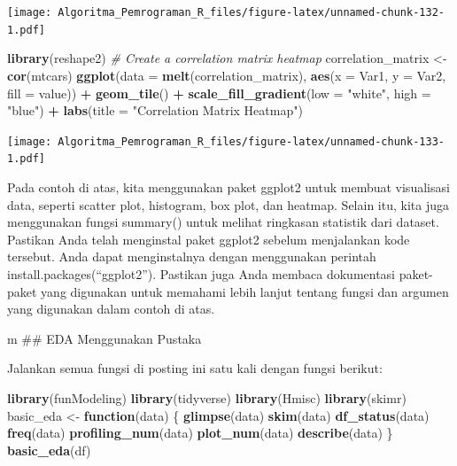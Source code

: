\documentclass[
]{book}
\newenvironment{Shaded}{\begin{snugshade}}{\end{snugshade}}
\newcommand{\AttributeTok}[1]{\textcolor[rgb]{0.13,0.29,0.53}{#1}}
\newcommand{\CommentTok}[1]{\textcolor[rgb]{0.56,0.35,0.01}{\textit{#1}}}
\newcommand{\ControlFlowTok}[1]{\textcolor[rgb]{0.13,0.29,0.53}{\textbf{#1}}}
\newcommand{\FunctionTok}[1]{\textcolor[rgb]{0.13,0.29,0.53}{\textbf{#1}}}
\newcommand{\NormalTok}[1]{#1}
\newcommand{\OtherTok}[1]{\textcolor[rgb]{0.56,0.35,0.01}{#1}}
\newcommand{\SpecialCharTok}[1]{\textcolor[rgb]{0.81,0.36,0.00}{\textbf{#1}}}
\newcommand{\StringTok}[1]{\textcolor[rgb]{0.31,0.60,0.02}{#1}}
\begin{document}
\texttt{[image: Algoritma\_Pemrograman\_R\_files/figure-latex/unnamed-chunk-132-1.pdf]}

\begin{Shaded}
\begin{Highlighting}[]
\FunctionTok{library}\NormalTok{(reshape2)}
\CommentTok{\# Create a correlation matrix heatmap}
\NormalTok{correlation\_matrix }\OtherTok{\textless{}{-}} \FunctionTok{cor}\NormalTok{(mtcars)}
\FunctionTok{ggplot}\NormalTok{(}\AttributeTok{data =} \FunctionTok{melt}\NormalTok{(correlation\_matrix), }\FunctionTok{aes}\NormalTok{(}\AttributeTok{x =}\NormalTok{ Var1, }\AttributeTok{y =}\NormalTok{ Var2, }\AttributeTok{fill =}\NormalTok{ value)) }\SpecialCharTok{+}
  \FunctionTok{geom\_tile}\NormalTok{() }\SpecialCharTok{+}
  \FunctionTok{scale\_fill\_gradient}\NormalTok{(}\AttributeTok{low =} \StringTok{"white"}\NormalTok{, }\AttributeTok{high =} \StringTok{"blue"}\NormalTok{) }\SpecialCharTok{+}
  \FunctionTok{labs}\NormalTok{(}\AttributeTok{title =} \StringTok{"Correlation Matrix Heatmap"}\NormalTok{)}
\end{Highlighting}
\end{Shaded}

\texttt{[image: Algoritma\_Pemrograman\_R\_files/figure-latex/unnamed-chunk-133-1.pdf]}

Pada contoh di atas, kita menggunakan paket ggplot2 untuk membuat visualisasi data, seperti scatter plot, histogram, box plot, dan heatmap. Selain itu, kita juga menggunakan fungsi summary() untuk melihat ringkasan statistik dari dataset. Pastikan Anda telah menginstal paket ggplot2 sebelum menjalankan kode tersebut. Anda dapat menginstalnya dengan menggunakan perintah install.packages(``ggplot2''). Pastikan juga Anda membaca dokumentasi paket-paket yang digunakan untuk memahami lebih lanjut tentang fungsi dan argumen yang digunakan dalam contoh di atas.

m
\#\# EDA Menggunakan Pustaka

Jalankan semua fungsi di posting ini satu kali dengan fungsi berikut:

\begin{Shaded}
\begin{Highlighting}[]
\FunctionTok{library}\NormalTok{(funModeling) }
\FunctionTok{library}\NormalTok{(tidyverse) }
\FunctionTok{library}\NormalTok{(Hmisc)}
\FunctionTok{library}\NormalTok{(skimr)}
\NormalTok{basic\_eda }\OtherTok{\textless{}{-}} \ControlFlowTok{function}\NormalTok{(data)}
\NormalTok{\{}
  \FunctionTok{glimpse}\NormalTok{(data)}
  \FunctionTok{skim}\NormalTok{(data)}
  \FunctionTok{df\_status}\NormalTok{(data)}
  \FunctionTok{freq}\NormalTok{(data) }
  \FunctionTok{profiling\_num}\NormalTok{(data)}
  \FunctionTok{plot\_num}\NormalTok{(data)}
  \FunctionTok{describe}\NormalTok{(data)}
\NormalTok{\}}
\FunctionTok{basic\_eda}\NormalTok{(df)}
\end{Highlighting}
\end{Shaded}
\end{document}
